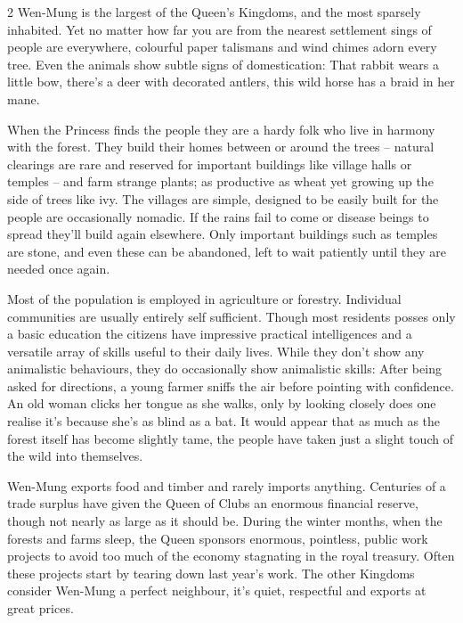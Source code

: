 \begin{multicols}{2}
Wen-Mung is the largest of the Queen's Kingdoms, and the most sparsely inhabited. Yet no matter how far you are from the nearest settlement sings of people are everywhere, colourful paper talismans and wind chimes adorn every tree. Even the animals show subtle signs of domestication: That rabbit wears a little bow, there's a deer with decorated antlers, this wild horse has a braid in her mane.

When the Princess finds the people they are a hardy folk who live in harmony with the forest. They build their homes between or around the trees – natural clearings are rare and reserved for important buildings like village halls or temples – and farm strange plants; as productive as wheat yet growing up the side of trees like ivy. The villages are simple, designed to be easily built for the people are occasionally nomadic. If the rains fail to come or disease beings to spread they'll build again elsewhere. Only important buildings such as temples are stone, and even these can be abandoned, left to wait patiently until they are needed once again.

Most of the population is employed in agriculture or forestry. Individual communities are usually entirely self sufficient. Though most residents posses only a basic education the citizens have impressive practical intelligences and a versatile array of skills useful to their daily lives. While they don't show any animalistic behaviours, they do occasionally show animalistic skills: After being asked for directions, a young farmer sniffs the air before pointing with confidence. An old woman clicks her tongue as she walks, only by looking closely does one realise it's because she's as blind as a bat. It would appear that as much as the forest itself has become slightly tame, the people have taken just a slight touch of the wild into themselves.

Wen-Mung exports food and timber and rarely imports anything. Centuries of a trade surplus have given the Queen of Clubs an enormous financial reserve, though not nearly as large as it should be. During the winter months, when the forests and farms sleep, the Queen sponsors enormous, pointless, public work projects to avoid too much of the economy stagnating in the royal treasury. Often these projects start by tearing down last year's work. The other Kingdoms consider Wen-Mung a perfect neighbour, it's quiet, respectful and exports at great prices. 

\begin{mybox}


\end{mybox}
\end{multicols}
